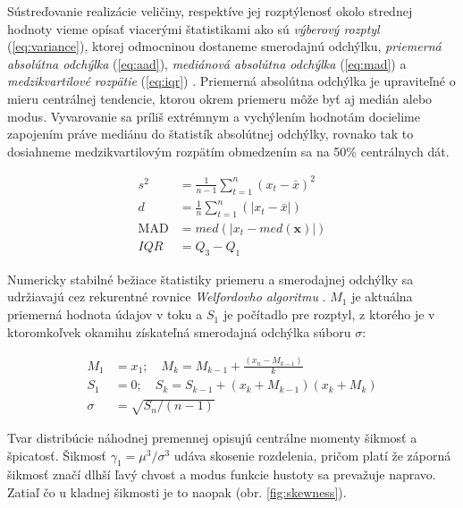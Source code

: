 Sústreďovanie realizácie veličiny, respektíve jej rozptýlenosť okolo strednej hodnoty vieme opísať viacerými štatistikami
ako sú \emph{výberový rozptyl} (\ref{eq:variance}), ktorej odmocninou dostaneme smerodajnú odchýlku, 
\emph{priemerná absolútna odchýlka} (\ref{eq:aad}), \emph{mediánová absolútna odchýlka} (\ref{eq:mad})
a \emph{medzikvartilové rozpätie} (\ref{eq:iqr}) \cite{zaklady-statistiky}. Priemerná absolútna odchýlka je 
upraviteľné o mieru centrálnej tendencie, ktorou okrem priemeru môže byť aj medián alebo modus. Vyvarovanie sa 
príliš extrémnym a vychýlením hodnotám docielime zapojením práve mediánu do štatistík absolútnej odchýlky, rovnako
tak to dosiahneme medzikvartilovým rozpätím obmedzením sa na 50\% centrálnych dát.
\begin{ceqn}\begin{align}
	s^2 &= \frac{1}{n - 1} \sum_{t = 1}^{n}{(x_t - \bar{x})^2} \label{eq:variance} \\
	d &= \frac{1}{n} \sum_{t = 1}^{n}(|x_t - \bar{x}|) \label{eq:aad} \\
	\mathrm{MAD} &= med(|x_t - med(\mathbf{x})|) \label{eq:mad} \\
	IQR &= Q_3 - Q_1 \label{eq:iqr}
\end{align}\end{ceqn}

Numericky stabilné bežiace štatistiky priemeru a smerodajnej odchýlky sa udržiavajú cez rekurentné rovnice
\emph{Welfordovho algoritmu} \cite{knuth}. $M_1$ je aktuálna priemerná hodnota údajov v toku a $S_1$ je počítadlo pre
rozptyl, z ktorého je v ktoromkoľvek okamihu získateľná smerodajná odchýlka súboru $\sigma$:
\begin{ceqn}\begin{align}
   M_1 &= x_1;\quad M_k = M_{k-1} + \frac{(x_n - M_{k-1})}{k} \\
   S_1 &= 0; \quad S_k = S_{k-1} + (x_k + M_{k-1})(x_k + M_k)  \\
   \sigma &= \sqrt{S_n / (n - 1)}
\end{align}\end{ceqn}

Tvar distribúcie náhodnej premennej opisujú centrálne momenty šikmosť a špicatosť. Šikmosť $\gamma_1 = \mu^3 / \sigma^3$ udáva skosenie 
rozdelenia, pričom platí že záporná šikmosť značí dlhší ľavý chvost a modus funkcie hustoty sa prevažuje napravo. Zatiaľ čo u kladnej 
šikmosti je to naopak (obr. \ref{fig:skewness}). 

